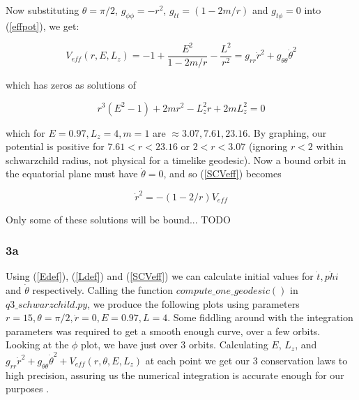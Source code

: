 \documentclass[10pt,a4paper]{report}
\begin{document}
\normalsize
Now substituting $\theta=\pi/2$, $g_{\phi\phi} = -r^2$, $g_{tt}=(1-2m/r)$ and $g_{t\phi} = 0$ into (\ref{effpot}), we get:

\begin{equation}
V_{eff}(r, E, L_z) = -1 + \frac{E^2}{1-2m/r} - \frac{L^2}{r^2} = g_{rr}\dot{r}^2+g_{\theta\theta}\dot{\theta}^2
\label{SCVeff}
\end{equation}

which has zeros as solutions of 

\begin{equation*}
r^3(E^2-1) + 2mr^2 -L_z^2r+2mL_z^2=0
\end{equation*}

which for $E=0.97, L_z=4, m=1$ are $\approx 3.07, 7.61, 23.16$. By graphing, our potential is positive for $7.61<r<23.16$ or $2<r<3.07$ (ignoring $r<2$ within schwarzchild radius, not physical for a timelike geodesic). Now a bound orbit in the equatorial plane must have $\dot{\theta}=0$, and so (\ref{SCVeff}) becomes

\begin{equation*}
\dot{r}^2 = -(1-2/r)V_{eff}
\end{equation*}

Only some of these solutions will be bound... TODO

\subsubsection*{3a}

Using (\ref{Edef}), (\ref{Ldef}) and (\ref{SCVeff}) we can calculate initial values for $\dot{t}, \dot{phi}$ and $\dot{\theta}$ respectively. Calling the function $compute\_one\_geodesic()$ in $q3\_schwarzchild.py$, we produce the following plots using parameters $r=15, \theta=\pi/2, \dot{r}=0, E=0.97, L=4$. Some fiddling around with the integration parameters was required to get a smooth enough curve, over a few orbits. Looking at the $\phi$ plot, we have just over 3 orbits. Calculating $E$, $L_z$, and $g_{rr}\dot{r}^2+g_{\theta\theta}\dot{\theta}^2 + V_{eff}(r, \theta, E, L_z)$ at each point we get our 3 conservation laws to high precision, assuring us the numerical integration is accurate enough for our purposes .
\end{document}
